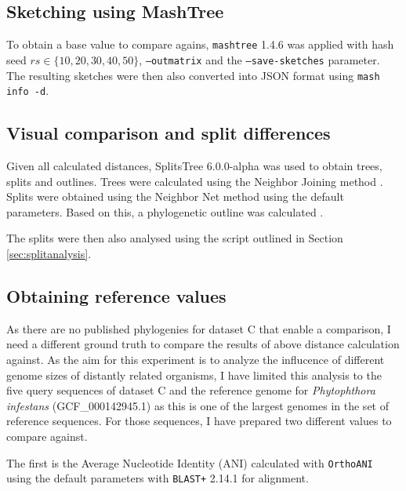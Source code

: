 \subsection*{Sketching using MashTree}
To obtain a base value to compare agains, \texttt{mashtree} 1.4.6
\cite{katzMashtreeRapidComparison2019,ondovMashFastGenome2016} was applied with
hash seed $rs \in \{10, 20, 30, 40, 50\}$, \texttt{--outmatrix} and the
\texttt{--save-sketches} parameter. The resulting sketches were then also
converted into JSON format using \texttt{mash info -d}.

\subsection*{Visual comparison and split differences}
Given all calculated distances, SplitsTree 6.0.0-alpha
\cite{husonApplicationPhylogeneticNetworks2006} was used to obtain trees, splits
and outlines. Trees were calculated using the Neighbor Joining method
\cite{saitouNeighborjoiningMethodNew1987}. Splits were obtained using the
Neighbor Net method
\cite{bryantNeighborNetAgglomerativeMethod2004,bryantNeighborNetImprovedAlgorithms2023}
using the default parameters. Based on this, a phylogenetic outline was
calculated \cite{bagciMicrobialPhylogeneticContext2021}.

The splits were then also analysed using the script outlined in Section
\ref{sec:splitanalysis}.

\subsection*{Obtaining reference values}
As there are no published phylogenies for dataset C that enable a comparison, I
need a different ground truth to compare the results of above distance
calculation against. As the aim for this experiment is to analyze the influcence
of different genome sizes of distantly related organisms, I have limited this
analysis to the five query sequences of dataset C and the reference genome for
\textit{Phytophthora infestans} (GCF\_000142945.1) as this is one of the largest
genomes in the set of reference sequences. For those sequences, I have prepared
two different values to compare against.

The first is the Average Nucleotide Identity (ANI)
\cite{konstantinidisGenomeBasedTaxonomyProkaryotes2005} calculated with
\texttt{OrthoANI} \cite{leeOrthoANIImprovedAlgorithm2016} using the default
parameters with \texttt{BLAST+} 2.14.1
\cite{camachoBLASTArchitectureApplications2009} for alignment.

